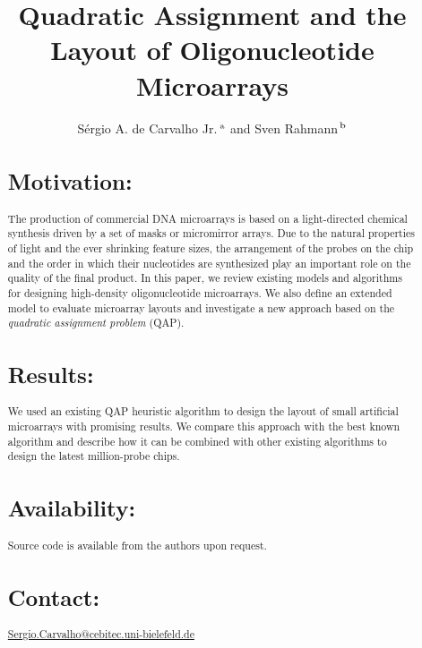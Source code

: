 \documentclass{bioinfo}
\begin{document}

\title[short Title]{Quadratic Assignment and the Layout of Oligonucleotide Microarrays}
\author[Sample \textit{et~al}]{S\'ergio A. de Carvalho Jr.\,$^{\rm a}$ and Sven Rahmann\,$^{\rm b}$}
\address{$^{\rm a}$Graduiertenkolleg Bioinformatik, Bielefeld University, Germany,\\$^{\rm b}$Algorithms and Statistics for Systems Biology, Genome Informatics, Bielefeld University, Germany.}
\maketitle

\begin{abstract}

\section{Motivation:}
The production of commercial DNA microarrays is based on a light-directed chemical synthesis driven by a set of masks or micromirror arrays. Due to the natural properties of light and the ever shrinking feature sizes, the arrangement of the probes on the chip and the order in which their nucleotides are synthesized play an important role on the quality of the final product. In this paper, we review existing models and algorithms for designing high-density oligonucleotide microarrays. We also define an extended model to evaluate microarray layouts and investigate a new approach based on the \emph{quadratic assignment problem} (QAP).
\section{Results:}
We used an existing QAP heuristic algorithm to design the layout of small artificial microarrays with promising results. We compare this approach with the best known algorithm and describe how it can be combined with other existing algorithms to design the latest million-probe chips.
\section{Availability:}
Source code is available from the authors upon request.
\section{Contact:} \href{Sergio.Carvalho@cebitec.uni-bielefeld.de}{Sergio.Carvalho@cebitec.uni-bielefeld.de}
\end{abstract}
\end{document}
